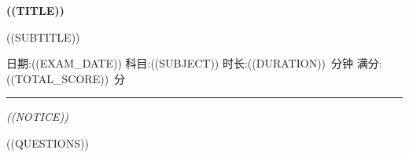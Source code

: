 \documentclass[11pt, a4paper, fontset=none]{ctexart}
\begin{document}
\begin{center}
  {\LARGE\bfseries ((TITLE))\par}
  \vspace{0.4em}
  {\normalsize\color[gray]{0.35} ((SUBTITLE))\par}
  \vspace{0.7em}
  {\small 日期:((EXAM_DATE)) \qquad 科目:((SUBJECT)) \qquad
   时长:((DURATION))~分钟 \qquad 满分:((TOTAL_SCORE))~分\par}
\end{center}

\noindent\rule{\linewidth}{0.6pt}
\smallskip

{\small\itshape ((NOTICE))\par}

\bigskip

((QUESTIONS))
\end{document}
